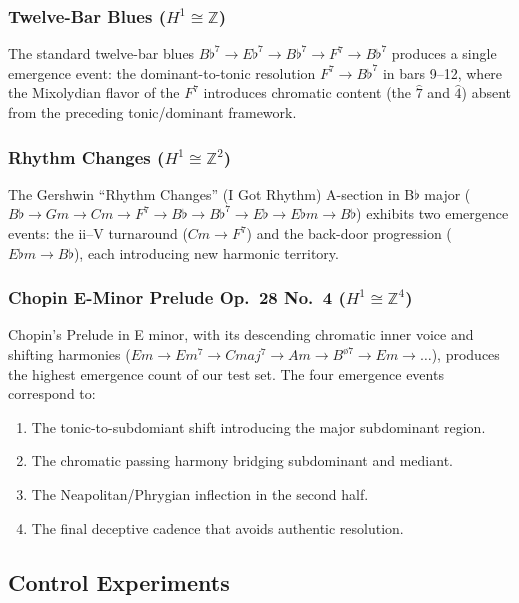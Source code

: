 \documentclass[12pt,a4paper]{article}
\newcommand{\ZZ}{\mathbb{Z}}
\newcommand{\Hone}{H^{1}}
\begin{document}
\subsubsection{Twelve-Bar Blues ($\Hone \cong \ZZ$)}

The standard twelve-bar blues $B\flat^7 \to E\flat^7 \to B\flat^7 \to F^7 \to B\flat^7$ 
produces a single emergence event: the dominant-to-tonic resolution $F^7 \to B\flat^7$ in 
bars 9--12, where the Mixolydian flavor of the $F^7$ introduces chromatic content (the 
$\hat{7}$ and $\hat{4}$) absent from the preceding tonic/dominant framework.

\subsubsection{Rhythm Changes ($\Hone \cong \ZZ^{2}$)}

The Gershwin ``Rhythm Changes'' (I Got Rhythm) A-section in B$\flat$ major 
($B\flat \to Gm \to Cm \to F^7 \to B\flat \to B\flat^7 \to E\flat \to E\flat m \to B\flat$) 
exhibits two emergence events: the ii--V turnaround ($Cm \to F^7$) and the back-door 
progression ($E\flat m \to B\flat$), each introducing new harmonic territory.

\subsubsection{Chopin E-Minor Prelude Op.\ 28 No.\ 4 ($\Hone \cong \ZZ^{4}$)}

Chopin's Prelude in E minor, with its descending chromatic inner voice and shifting harmonies 
($Em \to Em^{7} \to Cmaj^{7} \to Am \to B^{ø7} \to Em \to \ldots$), produces the highest 
emergence count of our test set. The four emergence events correspond to:
\begin{enumerate}
  \item The tonic-to-subdomiant shift introducing the major subdominant region.
  \item The chromatic passing harmony bridging subdominant and mediant.
  \item The Neapolitan/Phrygian inflection in the second half.
  \item The final deceptive cadence that avoids authentic resolution.
\end{enumerate}

\subsection{Control Experiments}
\end{document}
